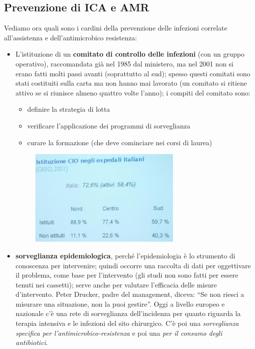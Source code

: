 \subsection{Prevenzione di ICA e AMR}

Vediamo ora quali sono i cardini della prevenzione delle infezioni correlate all'assistenza e dell'antimicrobico resistenza:

\begin{itemize}

\item L'istituzione di un \textbf{comitato di controllo delle infezioni} (con un gruppo operativo), raccomandata già nel 1985 dal ministero, ma nel 2001 non si erano fatti molti passi avanti (soprattutto al sud); spesso questi comitati sono stati costituiti sulla carta ma non hanno mai lavorato (un comitato si ritiene attivo se si riunisce almeno quattro volte l'anno); i compiti del comitato sono:

  \begin{itemize}
  \item definire la strategia di lotta
  \item verificare l'applicazione dei programmi di sorveglianza
  \item curare la formazione (che deve cominciare nei corsi di laurea)
  \end{itemize}

\begin{figure}[!ht]
\centering
	\includegraphics[width=0.7\textwidth]{19/image11.jpeg}
	\end{figure}

\item \textbf{sorveglianza epidemiologica}, perché l'epidemiologia è lo strumento di conoscenza per intervenire; quindi occorre una raccolta di dati per oggettivare il problema, come base per l'intervento (gli studi non sono fatti per essere tenuti nei cassetti); serve anche per valutare l'efficacia delle misure  d'intervento. Peter Drucker, padre del management, diceva: ``Se non riesci a misurare una situazione, non la puoi gestire''. Oggi a livello europeo e nazionale c'è una rete di sorveglianza dell'incidenza per quanto riguarda la terapia intensiva e le infezioni del sito chirurgico.
C'è poi una \emph{sorveglianza specifica per l'antimicrobico-resistenza} e poi una \emph{per il consumo degli antibiotici}.


\end{itemize}

